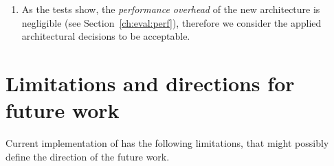 \begin{enumerate}[label=\arabic*.]
\begin{enumerate}[leftmargin=\parindent,label=\alph*.]
  \end{enumerate}
  
\item 
As the tests show, the \textit{performance overhead} of the new architecture is negligible (see Section~\ref{ch:eval:perf}), therefore we consider the applied architectural decisions to be acceptable.

\end{enumerate}


\section{Limitations and directions for future work}

Current implementation of \porthos[2] has the following limitations, that might possibly define the direction of the future work.

